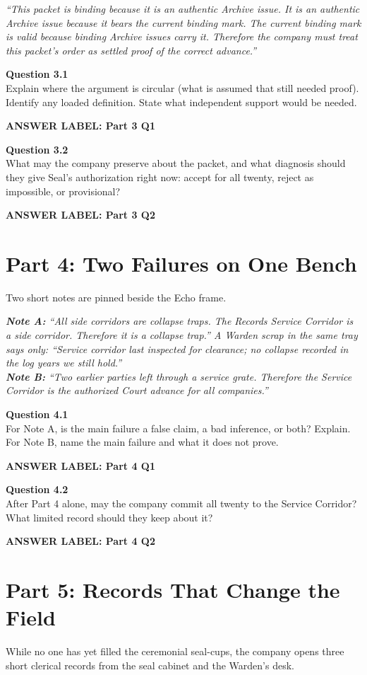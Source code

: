 \documentclass[12pt]{article}
\newcommand{\answerbox}[2]{\par\vspace{0.08em}\noindent\textbf{#1}\par\vspace{0.03em}\noindent\fbox{\begin{minipage}[t][#2]{\dimexpr\textwidth-2\fboxsep-2\fboxrule}\rule{\textwidth}{0pt}\vspace{#2}\end{minipage}}\par\vspace{0.16em}}
\newcommand{\cluebox}[1]{\par\vspace{0.12em}\noindent\begin{minipage}{\textwidth}\itshape #1\end{minipage}\par\vspace{0.12em}}
\begin{document}
\cluebox{``This packet is binding because it is an authentic Archive issue. It is an authentic Archive issue because it bears the current binding mark. The current binding mark is valid because binding Archive issues carry it. Therefore the company must treat this packet's order as settled proof of the correct advance.''}

\textbf{Question 3.1}\\[-0.15em]
Explain where the argument is circular (what is assumed that still needed proof). Identify any loaded definition. State what independent support would be needed.
\answerbox{ANSWER LABEL: Part 3 Q1}{2.15in}

\textbf{Question 3.2}\\[-0.15em]
What may the company preserve about the packet, and what diagnosis should they give Seal's authorization right now: accept for all twenty, reject as impossible, or provisional?
\answerbox{ANSWER LABEL: Part 3 Q2}{1.55in}

\newpage
\section*{Part 4: Two Failures on One Bench}
Two short notes are pinned beside the Echo frame.

\cluebox{\textbf{Note A:} ``All side corridors are collapse traps. The Records Service Corridor is a side corridor. Therefore it is a collapse trap.'' A Warden scrap in the same tray says only: ``Service corridor last inspected for clearance; no collapse recorded in the log years we still hold.''\\[0.25em]
\textbf{Note B:} ``Two earlier parties left through a service grate. Therefore the Service Corridor is the authorized Court advance for all companies.''}

\textbf{Question 4.1}\\[-0.15em]
For Note A, is the main failure a false claim, a bad inference, or both? Explain. For Note B, name the main failure and what it does not prove.
\answerbox{ANSWER LABEL: Part 4 Q1}{2.0in}

\textbf{Question 4.2}\\[-0.15em]
After Part 4 alone, may the company commit all twenty to the Service Corridor? What limited record should they keep about it?
\answerbox{ANSWER LABEL: Part 4 Q2}{1.55in}

\newpage
\section*{Part 5: Records That Change the Field}
While no one has yet filled the ceremonial seal-cups, the company opens three short clerical records from the seal cabinet and the Warden's desk.
\end{document}
